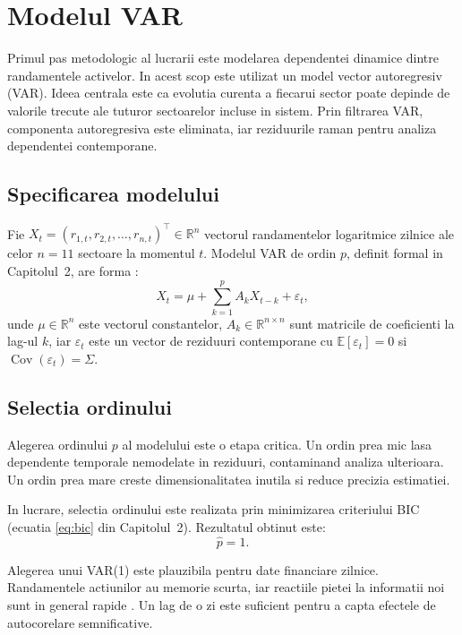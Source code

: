 \chapter{Modelul VAR}

Primul pas metodologic al lucrarii este modelarea dependentei dinamice dintre
randamentele activelor. In acest scop este utilizat un model vector autoregresiv
(VAR). Ideea centrala este ca evolutia curenta a fiecarui sector poate depinde
de valorile trecute ale tuturor sectoarelor incluse in sistem. Prin filtrarea
VAR, componenta autoregresiva este eliminata, iar reziduurile raman pentru
analiza dependentei contemporane.

\section{Specificarea modelului}

Fie $X_t = (r_{1,t}, r_{2,t}, \ldots, r_{n,t})^\top \in \mathbb{R}^n$ vectorul
randamentelor logaritmice zilnice ale celor $n = 11$ sectoare la momentul $t$.
Modelul VAR de ordin $p$, definit formal in Capitolul~2, are forma
\citep{lutkepohl2005}:
\begin{equation}
    X_t = \mu + \sum_{k=1}^{p} A_k X_{t-k} + \varepsilon_t,
    \label{eq:var_main}
\end{equation}
unde $\mu \in \mathbb{R}^n$ este vectorul constantelor, $A_k \in \mathbb{R}^{n \times n}$
sunt matricile de coeficienti la lag-ul $k$, iar $\varepsilon_t$ este un vector de reziduuri contemporane cu
$\mathbb{E}[\varepsilon_t] = 0$ si $\operatorname{Cov}(\varepsilon_t) = \Sigma$.

\section{Selectia ordinului}

Alegerea ordinului $p$ al modelului este o etapa critica. Un ordin prea mic
lasa dependente temporale nemodelate in reziduuri, contaminand analiza ulterioara.
Un ordin prea mare creste dimensionalitatea inutila si reduce precizia estimatiei.

In lucrare, selectia ordinului este realizata prin minimizarea criteriului BIC
(ecuatia \eqref{eq:bic} din Capitolul~2). Rezultatul obtinut este:
\begin{equation}
    \hat{p} = 1.
    \label{eq:order}
\end{equation}

Alegerea unui VAR(1) este plauzibila pentru date financiare zilnice. Randamentele
actiunilor au memorie scurta, iar reactiile pietei la informatii noi sunt in
general rapide \citep{fama1970,tsay2010}. Un lag de o zi este suficient pentru a capta
efectele de autocorelare semnificative.

